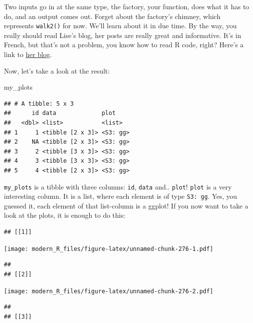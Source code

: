 \documentclass[]{gitbook}
\newenvironment{Shaded}{\begin{snugshade}}{\end{snugshade}}
\newcommand{\NormalTok}[1]{#1}
\newcommand{\OperatorTok}[1]{\textcolor[rgb]{0.81,0.36,0.00}{\textbf{#1}}}
\begin{document}
Two inputs go in at the same type, the factory, your function, does what it has to do, and an
output comes out. Forget about the factory's chimney, which represents \texttt{walk2()} for now. We'll
learn about it in due time. By the way, you really should read Lise's blog, her posts are really
great and informative. It's in French, but that's not a problem, you know how to read R code, right?
Here's a link to \href{http://perso.ens-lyon.fr/lise.vaudor/}{her blog}.

Now, let's take a look at the result:

\begin{Shaded}
\begin{Highlighting}[]
\NormalTok{my_plots}
\end{Highlighting}
\end{Shaded}

\begin{verbatim}
## # A tibble: 5 x 3
##      id data             plot    
##   <dbl> <list>           <list>  
## 1     1 <tibble [2 x 3]> <S3: gg>
## 2    NA <tibble [2 x 3]> <S3: gg>
## 3     2 <tibble [3 x 3]> <S3: gg>
## 4     3 <tibble [3 x 3]> <S3: gg>
## 5     4 <tibble [2 x 3]> <S3: gg>
\end{verbatim}

\texttt{my\_plots} is a tibble with three columns: \texttt{id}, \texttt{data} and.. \texttt{plot}! \texttt{plot} is a very interesting
column. It is a list, where each element is of type \texttt{S3:\ gg}. Yes, you guessed it, each element of
that list-column is a ggplot! If you now want to take a look at the plots, it is enough to do this:

\begin{Shaded}
\end{Shaded}

\begin{verbatim}
## [[1]]
\end{verbatim}

\texttt{[image: modern\_R\_files/figure-latex/unnamed-chunk-276-1.pdf]}

\begin{verbatim}
## 
## [[2]]
\end{verbatim}

\texttt{[image: modern\_R\_files/figure-latex/unnamed-chunk-276-2.pdf]}

\begin{verbatim}
## 
## [[3]]
\end{verbatim}
\end{document}

